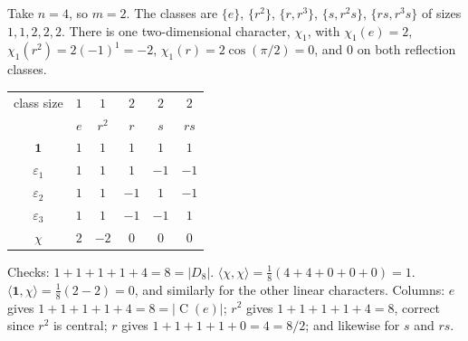 \documentclass[a4paper]{scrartcl}
\newcommand{\Cent}{\operatorname{C}}
\newcommand{\ip}[2]{\langle #1, #2 \rangle}
\begin{document}
\begin{example}[$D_8$]
	Take $n = 4$, so $m=2$. The classes are $\{e\}$, $\{r^2\}$, $\{r,r^3\}$, $\{s,r^2s\}$, $\{rs,r^3s\}$ of sizes $1,1,2,2,2$. There is one two-dimensional character, $\chi_1$, with $\chi_1(e)=2$, $\chi_1(r^2) = 2(-1)^1 = -2$, $\chi_1(r) = 2\cos(\pi/2) = 0$, and $0$ on both reflection classes.
	\begin{center}
	\renewcommand{\arraystretch}{1.3}
	\setlength{\tabcolsep}{11pt}
	\begin{tabular}{c|ccccc}
	\toprule
	class size & $1$ & $1$ & $2$ & $2$ & $2$\\
	 & $e$ & $r^2$ & $r$ & $s$ & $rs$\\
	\midrule
	$\mathbf 1$ & $1$ & $1$ & $1$ & $1$ & $1$\\
	$\varepsilon_1$ & $1$ & $1$ & $1$ & $-1$ & $-1$\\
	$\varepsilon_2$ & $1$ & $1$ & $-1$ & $1$ & $-1$\\
	$\varepsilon_3$ & $1$ & $1$ & $-1$ & $-1$ & $1$\\
	$\chi$ & $2$ & $-2$ & $0$ & $0$ & $0$\\
	\bottomrule
	\end{tabular}
	\end{center}
	Checks: $1+1+1+1+4 = 8 = |D_8|$. $\ip\chi\chi = \frac18(4 + 4 + 0+0+0) = 1$. $\ip{\mathbf1}\chi = \frac18(2 - 2) = 0$, and similarly for the other linear characters. Columns: $e$ gives $1+1+1+1+4 = 8 = |\Cent(e)|$; $r^2$ gives $1+1+1+1+4 = 8$, correct since $r^2$ is central; $r$ gives $1+1+1+1+0 = 4 = 8/2$; and likewise for $s$ and $rs$.
\end{example}
\end{document}
